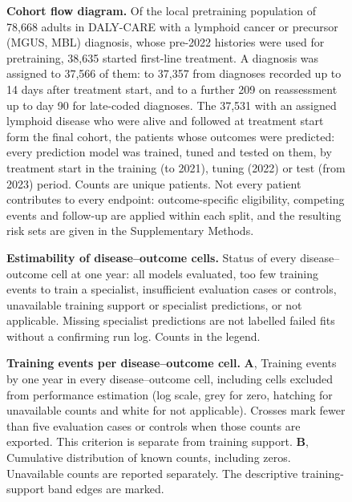 \begin{figure}[p]
  \centering
  \resizebox{!}{0.80\textheight}{}
  \caption{\textbf{Cohort flow diagram.} Of the local pretraining population of 78,668
  adults in DALY-CARE with a lymphoid cancer or precursor (MGUS, MBL) diagnosis, whose pre-2022 histories
  were used for pretraining, 38,635 started first-line treatment. A diagnosis
  was assigned to 37,566 of them: to 37,357 from diagnoses recorded up to 14
  days after treatment start, and to a further 209 on reassessment up to day 90
  for late-coded diagnoses. The 37,531 with an assigned lymphoid disease who
  were alive and followed at treatment start form the final cohort, the
  patients whose outcomes were predicted: every prediction model was trained,
  tuned and tested on them, by treatment start in the training (to 2021),
  tuning (2022) or test (from 2023) period. Counts are unique patients. Not every patient contributes to every endpoint: outcome-specific eligibility,
  competing events and follow-up are applied within each split, and the
  resulting risk sets are given in the Supplementary Methods.}
  \label{fig:cohort-flow}
\end{figure}

\begin{figure}[p]
  \caption{\textbf{Estimability of disease--outcome cells.} Status of every
  disease--outcome cell at one year: all models evaluated, too few training
  events to train a specialist, insufficient evaluation cases or controls,
  unavailable training support or specialist predictions, or not applicable.
  Missing specialist predictions are not labelled failed fits without a confirming run log. Counts in the legend.}
  \label{fig:supp-coverage}
\end{figure}

\begin{figure}[p]
  \caption{\textbf{Training events per disease--outcome cell.}
  \textbf{A}, Training events by one year in every disease--outcome cell, including cells excluded from performance
  estimation (log scale, grey for zero, hatching for unavailable counts and
  white for not applicable).
  Crosses mark fewer than five evaluation cases or controls when those counts
  are exported. This criterion is separate from training support. \textbf{B},
  Cumulative distribution of known counts, including zeros. Unavailable counts
  are reported separately. The descriptive training-support band edges are marked.}
  \label{fig:supp-support}
\end{figure}

